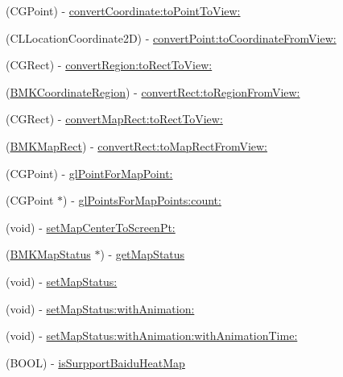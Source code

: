 \begin{DoxyCompactItemize}
\item 
(C\+G\+Point) -\/ \hyperlink{interface_b_m_k_map_view_a46ec1b9f485f41a04ffe76300624f5b4}{convert\+Coordinate\+:to\+Point\+To\+View\+:}
\item 
(C\+L\+Location\+Coordinate2\+D) -\/ \hyperlink{interface_b_m_k_map_view_a6ab0dbfdf28bf2ab29174d9a70ce2e9c}{convert\+Point\+:to\+Coordinate\+From\+View\+:}
\item 
(C\+G\+Rect) -\/ \hyperlink{interface_b_m_k_map_view_a952023c2e24a13c993977d276745f329}{convert\+Region\+:to\+Rect\+To\+View\+:}
\item 
(\hyperlink{struct_b_m_k_coordinate_region}{B\+M\+K\+Coordinate\+Region}) -\/ \hyperlink{interface_b_m_k_map_view_ae99130c0eceabae6c9e202699ba375d1}{convert\+Rect\+:to\+Region\+From\+View\+:}
\item 
(C\+G\+Rect) -\/ \hyperlink{interface_b_m_k_map_view_a4a802244887690c7238bd5c8e18918ae}{convert\+Map\+Rect\+:to\+Rect\+To\+View\+:}
\item 
(\hyperlink{struct_b_m_k_map_rect}{B\+M\+K\+Map\+Rect}) -\/ \hyperlink{interface_b_m_k_map_view_afa77dab84c13620c4ce0dee46df87b46}{convert\+Rect\+:to\+Map\+Rect\+From\+View\+:}
\item 
(C\+G\+Point) -\/ \hyperlink{interface_b_m_k_map_view_ad2ae70da77b6ba304cd37413fe5a5c78}{gl\+Point\+For\+Map\+Point\+:}
\item 
(C\+G\+Point $\ast$) -\/ \hyperlink{interface_b_m_k_map_view_a56625ec8600403ba03d20cfa0715ee61}{gl\+Points\+For\+Map\+Points\+:count\+:}
\item 
(void) -\/ \hyperlink{interface_b_m_k_map_view_afc552204ea098d293a4f0d7ebf35b8ac}{set\+Map\+Center\+To\+Screen\+Pt\+:}
\item 
(\hyperlink{interface_b_m_k_map_status}{B\+M\+K\+Map\+Status} $\ast$) -\/ \hyperlink{interface_b_m_k_map_view_a419f8ac73742ccf9ef7fb921b349bca4}{get\+Map\+Status}
\item 
(void) -\/ \hyperlink{interface_b_m_k_map_view_a595b3baaa42f35fd5fa3b778011a59d7}{set\+Map\+Status\+:}
\item 
(void) -\/ \hyperlink{interface_b_m_k_map_view_abf8e2308ae62e367f8b1271a9918060f}{set\+Map\+Status\+:with\+Animation\+:}
\item 
(void) -\/ \hyperlink{interface_b_m_k_map_view_a9668d8aa419c7a9140c79846fabc3598}{set\+Map\+Status\+:with\+Animation\+:with\+Animation\+Time\+:}
\item 
(B\+O\+O\+L) -\/ \hyperlink{interface_b_m_k_map_view_a2256a65857b14f9cd56655663a966e14}{is\+Surpport\+Baidu\+Heat\+Map}

\end{DoxyCompactItemize}
